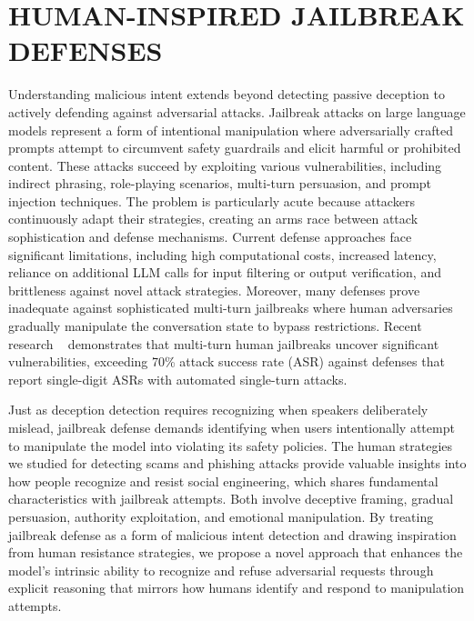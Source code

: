 \pagestyle{plain} %


\chapter{\uppercase {Human-Inspired Jailbreak Defenses }}


Understanding malicious intent extends beyond detecting passive deception to actively defending against adversarial attacks. Jailbreak attacks on large language models represent a form of intentional manipulation where adversarially crafted prompts attempt to circumvent safety guardrails and elicit harmful or prohibited content. These attacks succeed by exploiting various vulnerabilities, including indirect phrasing, role-playing scenarios, multi-turn persuasion, and prompt injection techniques. The problem is particularly acute because attackers continuously adapt their strategies, creating an arms race between attack sophistication and defense mechanisms. Current defense approaches face significant limitations, including high computational costs, increased latency, reliance on additional LLM calls for input filtering or output verification, and brittleness against novel attack strategies. Moreover, many defenses prove inadequate against sophisticated multi-turn jailbreaks where human adversaries gradually manipulate the conversation state to bypass restrictions. Recent research ~\cite{mhj} demonstrates that multi-turn human jailbreaks uncover significant vulnerabilities, exceeding 70\% attack success rate (ASR) against defenses that report single-digit ASRs with automated single-turn attacks.

Just as deception detection requires recognizing when speakers deliberately mislead, jailbreak defense demands identifying when users intentionally attempt to manipulate the model into violating its safety policies. The human strategies we studied for detecting scams and phishing attacks provide valuable insights into how people recognize and resist social engineering, which shares fundamental characteristics with jailbreak attempts. Both involve deceptive framing, gradual persuasion, authority exploitation, and emotional manipulation. By treating jailbreak defense as a form of malicious intent detection and drawing inspiration from human resistance strategies, we propose a novel approach that enhances the model's intrinsic ability to recognize and refuse adversarial requests through explicit reasoning that mirrors how humans identify and respond to manipulation attempts.

